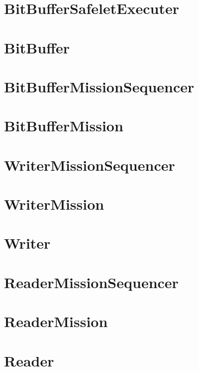 \documentclass[10pt,a4paper,final]{article}
\begin{document}
\section{BitBufferSafeletExecuter}

\pagebreak

\section{BitBuffer}

\pagebreak

\section{BitBufferMissionSequencer}

\pagebreak

\section{BitBufferMission}

\pagebreak

\section{WriterMissionSequencer}

\pagebreak

\section{WriterMission}

\pagebreak

\section{Writer}

\pagebreak


\section{ReaderMissionSequencer}

\pagebreak

\section{ReaderMission}

\pagebreak

\section{Reader}

\pagebreak
\end{document}
